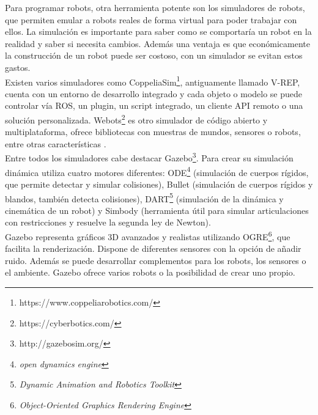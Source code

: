 Para programar robots, otra herramienta potente son los simuladores de robots, que permiten emular a robots reales de forma virtual para poder trabajar con ellos. La simulación es importante para saber como se comportaría un robot en la realidad y saber si necesita cambios. Además una ventaja es que económicamente la construcción de un robot puede ser costoso, con un simulador se evitan estos gastos.\\

Existen varios simuladores como CoppeliaSim\footnote{https://www.coppeliarobotics.com/}, antiguamente llamado V-REP, cuenta con un entorno de desarrollo integrado y cada objeto o modelo se puede controlar vía ROS, un plugin, un script integrado, un cliente API remoto o una solución personalizada\cite{sim}.  Webots\footnote{https://cyberbotics.com/} es otro simulador de código abierto y multiplataforma, ofrece bibliotecas con muestras de mundos, sensores o robots, entre otras características \cite{körber2021comparing}.\\

Entre todos los simuladores cabe destacar Gazebo\footnote{http://gazebosim.org/}. Para crear su simulación dinámica utiliza cuatro motores diferentes: ODE\footnote{\textit{open dynamics engine}} (simulación de cuerpos rígidos, que permite detectar y simular colisiones), Bullet (simulación de cuerpos rígidos y blandos, también detecta colisiones), DART\footnote{\textit{Dynamic Animation and Robotics Toolkit}} (simulación de la dinámica y cinemática de un robot) y Simbody (herramienta útil para simular articulaciones con restricciones y resuelve la segunda ley de Newton)\cite{upm56724}.\\

Gazebo representa gráficos 3D avanzados y realistas utilizando OGRE\footnote{\textit{Object-Oriented Graphics Rendering Engine}}, que facilita la renderización. Dispone de diferentes sensores con la opción de añadir ruido. Además se puede desarrollar complementos para los robots, los sensores o el ambiente. Gazebo ofrece varios robots o la posibilidad de crear uno propio\cite{gaz}.
